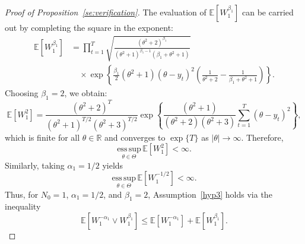 \documentclass[pdflatex,sn-mathphys-num]{sn-jnl}
\renewcommand{\leq}{\leqslant}
\theoremstyle{thmstyleone}
\theoremstyle{thmstyletwo}
\theoremstyle{thmstylethree}
\begin{document}
\begin{proof}[Proof of Proposition~\ref{se:verification}]
The evaluation of \( \mathbb{E}[W_1^{\beta_1}] \) can be carried out by completing the square in the exponent:
\begin{align*}
\mathbb{E}[W_1^{\beta_1}] 
&= \prod_{t=1}^{T} \sqrt{ \frac{(\theta^2 + 2)^{\beta_1}}{(\theta^2 + 1)^{\beta_1 - 1} (\beta_1 + \theta^2 + 1)} } \\
&\quad \times \exp\left\{ \frac{\beta_1}{2} (\theta^2 + 1)(\theta - y_t)^2 
\left( \frac{1}{\theta^2 + 2} - \frac{1}{\beta_1 + \theta^2 + 1} \right) \right\}.
\end{align*}
Choosing \( \beta_1 = 2 \), we obtain:
\[
\mathbb{E}[W_1^2] = \frac{(\theta^2 + 2)^T}{(\theta^2 + 1)^{T/2} (\theta^2 + 3)^{T/2}} 
\exp\left\{ \frac{(\theta^2 + 1)}{(\theta^2 + 2)(\theta^2 + 3)} 
\sum_{t=1}^T (\theta - y_t)^2 \right\},
\]
which is finite for all \( \theta \in \mathbb{R} \) and converges to \( \exp\{T\} \) as \( |\theta| \to \infty \). Therefore,
\[
\underset{\theta \in \Theta}{\mathrm{ess\,sup}} \, \mathbb{E}[W_1^2] < \infty.
\]
Similarly, taking \( \alpha_1 = 1/2 \) yields
\[
\underset{\theta \in \Theta}{\mathrm{ess\,sup}} \, \mathbb{E}[W_1^{-1/2}] < \infty.
\]
Thus, for \( N_0 = 1 \), \( \alpha_1 = 1/2 \), and \( \beta_1 = 2 \), Assumption~\ref{hyp3} holds via the inequality
\[
\mathbb{E}[W_1^{-\alpha_1} \vee W_1^{\beta_1}] 
\leq \mathbb{E}[W_1^{-\alpha_1}] + \mathbb{E}[W_1^{\beta_1}].
\]


\end{proof}
\end{document}
